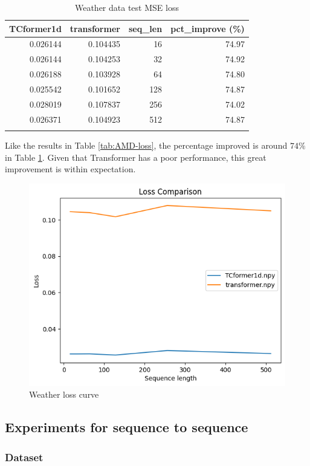 \documentclass[stu,12pt,floatsintext]{apa7}
\begin{document}
\begin{table}[H]
\centering
\begin{tabular}{rrrr}
\toprule
TCformer1d & transformer & seq\_len & pct\_improve (\%) \\
\midrule
0.026144 & 0.104435 & 16 & 74.97 \\
0.026144 & 0.104253 & 32 & 74.92 \\
0.026188 & 0.103928 & 64 & 74.80 \\
0.025542 & 0.101652 & 128 & 74.87 \\
0.028019 & 0.107837 & 256 & 74.02 \\
0.026371 & 0.104923 & 512 & 74.87 \\
\bottomrule\\
\end{tabular}
\caption{Weather data test MSE loss}
\label{tab:weather-loss}
\end{table}

Like the results in Table \ref{tab:AMD-loss}, the percentage improved is around $74\%$ in Table \ref{tab:weather-loss}. Given that Transformer has a poor performance, this great improvement is within expectation. 


\begin{figure}[H]
    \centering
    \includegraphics[width=0.8\linewidth]{images/weather-loss-cmp.png}
    \caption{Weather loss curve}
    \label{fig:weather-loss-curve}
\end{figure}

\subsection{Experiments for sequence to sequence}

\subsubsection{Dataset}
\end{document}
